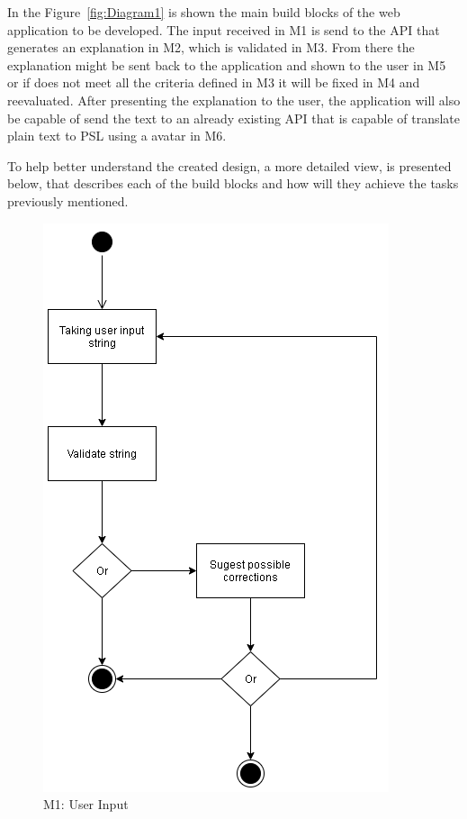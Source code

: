 In the Figure~\ref{fig:Diagram1} is shown the main build blocks of the web application to be developed.
The input received in M1 is send to the \gls{API} that generates an explanation in M2, which is validated in M3.
From there the explanation might be sent back to the application and shown to the user in M5  or if does not meet all the criteria defined in M3 it will be fixed in M4 and reevaluated.
After presenting the explanation to the user, the application will also be capable of send the text to an already existing \gls{API} that is capable of translate plain text to \gls{PSL} using a avatar in M6.

To help better understand the created design, a more detailed view, is presented below, that describes each of the build blocks and how will they achieve the tasks previously mentioned.

\begin{figure}[H]
\centering
\includegraphics[scale=0.5]{ch4/assets/M1.png}
\caption[User Input Module]{M1: User Input}
\label{fig:M1}
\end{figure}

